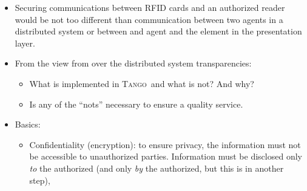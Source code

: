 \documentclass[10pt,a4paper,twoside]{llncs}
\newcommand{\tango}{\textsc{Tango}}
\begin{document}
\begin{itemize}
    \item Securing communications between RFID cards and an authorized reader \cite{Santi11} would be not too different than communication between two agents in a distributed system or between and agent and the element in the presentation layer.
    \item From the view from \cite{TanenbaumDistr} over the distributed system transparencies:
    \begin{itemize}
        \item What is implemented in \tango\, and what is not? And why?
        \item Is any of the ``nots'' necessary to ensure a quality service.
    \end{itemize}
    \begin{table}
    \end{table}
    \item Basics:
    \begin{itemize}
        \item Confidentiality (encryption): to ensure privacy, the information must not be accessible to unauthorized parties. Information must be disclosed only \emph{to} the authorized (and only \emph{by} the authorized, but this is in another step),

\end{itemize}
\end{itemize}
\end{document}
